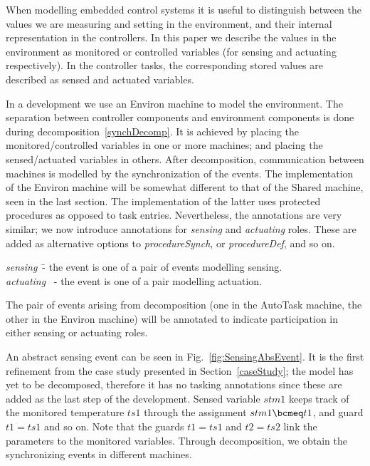 When modelling embedded control systems it is useful to distinguish between the values we are measuring and setting in the environment, and their internal representation in the controllers. In this paper we describe the values in the environment as monitored or controlled variables (for sensing and actuating respectively). In the controller tasks, the corresponding stored values are described as sensed and actuated variables. 

In a development we use an Environ machine to model the environment. The separation between controller components and environment components is done during decomposition~\ref{synchDecomp}. It is achieved by placing the monitored/controlled variables in one or more machines; and placing the sensed/actuated variables in others. After decomposition, communication between machines is modelled by the synchronization of the events. The implementation of the Environ machine will be somewhat different to that of the Shared machine, seen in the last section. The implementation of the latter uses protected procedures as opposed to task entries. Nevertheless, the annotations are very similar; we now introduce annotations for \emph{sensing} and \emph{actuating} roles. These are added as alternative options to \emph{procedureSynch}, or \emph{procedureDef}, and so on.
%
\begin{center}
\begin{minipage}{0.9\textwidth}
\begin{tabbing}
\emph{sensing}~\quad  \=- the event is one of a pair of events modelling sensing.
\\
\emph{actuating}~ \>- the event is one of a pair modelling actuation.
\\
\end{tabbing}
\end{minipage}
\end{center}
%
The pair of events arising from decomposition (one in the AutoTask machine, the other in the Environ machine) will be annotated to indicate participation in either sensing or actuating roles.

An abstract sensing event can be seen in Fig.~\ref{fig:SensingAbsEvent}. It is the first refinement from the case study presented in Section~\ref{caseStudy}; the model has yet to be decomposed, therefore it has no tasking annotations since these are added as the last step of the development. Sensed variable $stm1$ keeps track of the monitored temperature $ts1$ through the assignment $stm1 \bcmeq t1$, and guard $t1 = ts1$ and so on. Note that the guards $t1 = ts1$ and $t2 = ts2$ link the parameters to the monitored variables. Through decomposition, we obtain the synchronizing events in different machines. 

